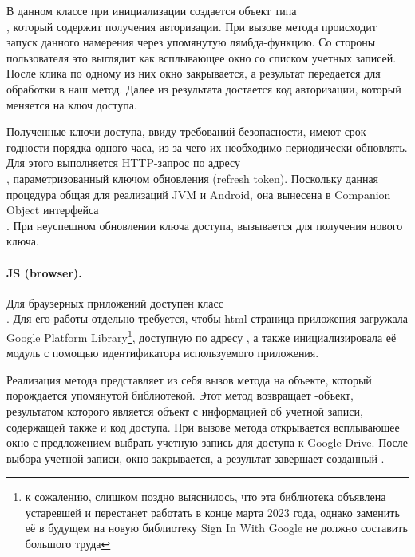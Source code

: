         В данном классе при инициализации создается объект типа\\ , который содержит  получения авторизации. При вызове метода  происходит запуск данного намерения через упомянутую лямбда-функцию. Со стороны пользователя это выглядит как всплывающее окно со списком учетных записей. После клика по одному из них окно закрывается, а результат передается для обработки в наш метод. Далее из результата достается код авторизации, который меняется на ключ доступа.

        Полученные ключи доступа, ввиду требований безопасности, имеют срок годности порядка одного часа, из-за чего их необходимо периодически обновлять. Для этого выполняется HTTP-запрос по адресу\\ , параметризованный ключом обновления (refresh token). Поскольку данная процедура общая для реализаций JVM и Android, она вынесена в Companion Object интерфейса\\ . При неуспешном обновлении ключа доступа, вызывается  для получения нового ключа.
        
        \paragraph{JS (browser).} Для браузерных приложений доступен класс\\ . Для его работы отдельно требуется, чтобы html-страница приложения загружала Google Platform Library\footnote{к сожалению, слишком поздно выяснилось, что эта библиотека объявлена устаревшей и перестанет работать в конце марта 2023 года, однако заменить её в будущем на новую библиотеку Sign In With Google не должно составить большого труда}, доступную по адресу , а также инициализировала её модуль  с помощью идентификатора используемого приложения. 

        Реализация метода  представляет из себя вызов метода  на объекте, который порождается упомянутой библиотекой. Этот метод возвращает -объект\cite{js-promise}, результатом которого является объект с информацией об учетной записи, содержащей также и код доступа. При вызове метода  открывается всплывающее окно с предложением выбрать учетную запись для доступа к Google Drive. После выбора учетной записи, окно закрывается, а результат завершает созданный .


